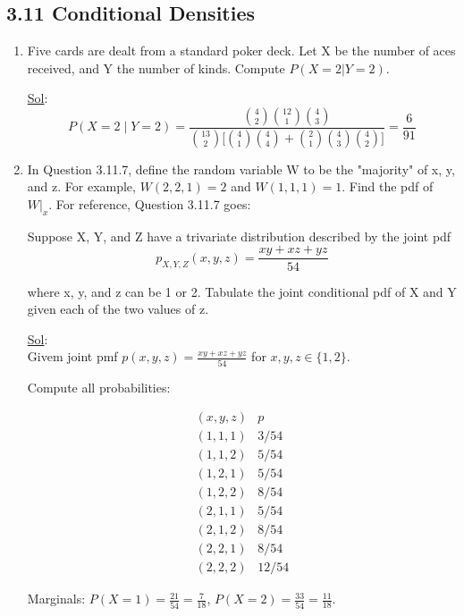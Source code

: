 \subsection*{3.11 Conditional Densities}
\begin{enumerate}
	\item[4.] Five cards are dealt from a standard poker deck. Let X be the number of aces received, and Y the number of kinds. Compute \(P(X = 2 | Y = 2)\).

	      \underline{Sol}: \\

	      \[
		      P(X=2\mid Y=2)=\frac{\binom{4}{2}\binom{12}{1}\binom{4}{3}}{\binom{13}{2}\bigl[\binom{4}{1}\binom{4}{4}+\binom{2}{1}\binom{4}{3}\binom{4}{2}\bigr]}=\boxed{\frac{6}{91}}
	      \]

	\item[8.] In Question 3.11.7, define the random variable W to be the "majority" of x, y, and z. For example, \(W(2, 2, 1) = 2\) and \(W (1, 1, 1) = 1\). Find the pdf of \(W|_x\). For reference, Question 3.11.7 goes:

	      Suppose X, Y, and Z have a trivariate distribution described by the joint pdf
	      \[
		      p_{X, Y, Z} (x, y, z) = \frac{xy + xz + yz}{54}
	      \]

	      where x, y, and z can be 1 or 2. Tabulate the joint conditional pdf of X and Y given each of the two values of z.

	      \underline{Sol}: \\

	      Givem joint pmf \(p(x,y,z) = \frac{xy+xz+yz}{54}\) for \(x,y,z\in\{1,2\}\).

	      Compute all probabilities:

	      \[
		      \begin{array}{c|c}
			      (x,y,z) & p     \\ \hline
			      (1,1,1) & 3/54  \\
			      (1,1,2) & 5/54  \\
			      (1,2,1) & 5/54  \\
			      (1,2,2) & 8/54  \\
			      (2,1,1) & 5/54  \\
			      (2,1,2) & 8/54  \\
			      (2,2,1) & 8/54  \\
			      (2,2,2) & 12/54
		      \end{array}
	      \]

	      Marginals: \(P(X=1)=\frac{21}{54}=\frac{7}{18}\), \(P(X=2)=\frac{33}{54}=\frac{11}{18}\).


\end{enumerate}
